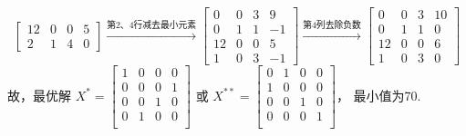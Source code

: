 \begin{solution}
$$\begin{bmatrix}
        12 & 0  & 0  & 5 \\
        2  & 1  & 4  & 0
    \end{bmatrix}
    \xrightarrow{\text{第2、4行减去最小元素}}
    \begin{bmatrix}
        0  & 0  & 3  & 9 \\
        0  & 1  & 1  & -1\\
        12 & 0  & 0  & 5 \\
        1  & 0  & 3  & -1
    \end{bmatrix}
    \xrightarrow{\text{第4列去除负数}}
    \begin{bmatrix}
        0  & 0  & 3  & 10\\
        0  & 1  & 1  & 0 \\
        12 & 0  & 0  & 6 \\
        1  & 0  & 3  & 0
    \end{bmatrix}$$
    故，最优解
    $X^{*}=\begin{bmatrix}
        1  & 0  & 0  & 0  \\
        0  & 0  & 0  & 1  \\
        0  & 0  & 1  & 0  \\
        0  & 1  & 0  & 0  \\
    \end{bmatrix}$
    或
    $X^{**}=\begin{bmatrix}
        0  & 1  & 0  & 0  \\
        1  & 0  & 0  & 0  \\
        0  & 0  & 1  & 0  \\
        0  & 0  & 0  & 1  \\
    \end{bmatrix}$，
    最小值为70.
\end{solution}

